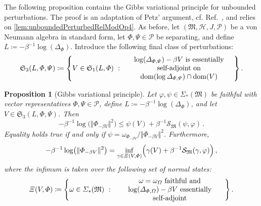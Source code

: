 \documentclass[a4paper, twoside, 11pt, reqno]{amsart}
\theoremstyle{definition}
\theoremstyle{plain}
\newtheorem{proposition}[definition]{Proposition}
\let\originalleft\left
\let\originalright\right
\renewcommand{\left}{\mathopen{}\mathclose\bgroup\originalleft}
\renewcommand{\right}{\aftergroup\egroup\originalright}
\renewcommand{\Delta}{\varDelta}
\renewcommand{\Xi}{\varXi}
\renewcommand{\Sigma}{\varSigma}
\renewcommand{\Phi}{\varPhi}
\renewcommand{\Psi}{\varPsi}
\renewcommand{\Omega}{\varOmega}
\newcommand{\MH}{\mathcal{H}}
\newcommand{\MS}{\mathcal{S}}
\newcommand{\MFM}{\mathfrak{M}}
\newcommand{\MFS}{\mathfrak{S}}
\newcommand{\NS}[1]{\Sigma_{\ast}(#1)}
\newcommand{\NPC}{\mathcal{P}}
\newcommand{\1}{\mathbf{1}}
\DeclareMathOperator{\dom}{dom}
\newcommand{\norm}[2][]{#1\Vert{#2}#1\Vert}
\newcommand{\ce}{\coloneqq}
\newcommand{\inv}[1]{#1^{-1}}
\begin{document}
The following proposition contains the Gibbs variational principle for unbounded perturbations. The proof is an adaptation of Petz' argument, cf. Ref.~\cite[Prop. 1 \& Cor. 2]{Petz1988}, and relies on \cref{lem:unboundedPerturbedRelModOp4}. As before, let $(\MFM, \MH, J, \NPC)$ be a von Neumann algebra in standard form, let $\Phi, \Psi \in \NPC$ be separating, and define $L \ce - \inv{\beta} \log(\Delta_\Phi)$. Introduce the following final class of perturbations:
\begin{equation*}
    \MFS_3(L, \Phi, \Psi) \ce \left\{V \in \MFS_1(L, \Phi) \ : \ \parbox{0.45\textwidth}{\centering $\log(\Delta_{\Phi, \Psi}) - \beta V$ is essentially self-adjoint on $\dom(\log \Delta_{\Phi, \Psi}) \cap \dom(V)$}\right\} \, .
\end{equation*}

\begin{proposition}[Gibbs variational principle]\label{pro:GibbsVariationalPrinciple}
    Let $\varphi, \psi \in \NS{\MFM}$ be faithful with vector representatives $\Phi, \Psi \in \NPC$, define $L \ce - \inv{\beta} \log(\Delta_\Phi)$, and let $V \in \MFS_3(L, \Phi, \Psi)$. Then
    \begin{equation}\label{eq:generalizedPBinequality}
        - \inv{\beta} \log \bigl(\norm{\Phi_{- \beta V}}^2\bigr) \le \psi(V) + \inv{\beta} \MS_\MFM(\psi, \varphi) \, .
    \end{equation}
    Equality holds true if and only if $\psi = \omega_{\Phi_{- \beta V}} / \norm{\Phi_{- \beta V}}^2$. Furthermore,
    \begin{equation}\label{eq:generalizedGibbsVP}
        - \inv{\beta} \log\bigl(\norm{\Phi_{- \beta V}}^2\bigr) = \inf_{\gamma \in \Xi(V, \Phi)} \Bigl(\gamma(V) + \inv{\beta} \MS_\MFM(\gamma, \varphi)\Bigr) \, ,
    \end{equation}
    where the infimum is taken over the following set of normal states:
    \begin{equation*}
        \Xi(V, \Phi) \ce \left\{\omega \in \NS{\MFM} \ : \ \parbox{0.45\textwidth}{\centering $\omega = \omega_\Omega$ faithful and $\log(\Delta_{\Phi, \Omega}) - \beta V$ essentially self-adjoint}\right\} \, .
    \end{equation*}
\end{proposition}
\end{document}
